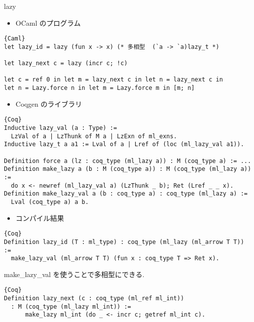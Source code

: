 \documentclass[unicode,mathserif]{beamer}
\begin{document}
\begin{frame}[fragile]
\begin{columns}[T]
    \begin{column}{0.33\columnwidth}
      \begin{block}{lazy}
        \begin{itemize}
          \item OCaml のプログラム
        \end{itemize}
        \begin{lstlisting}{Caml}
let lazy_id = lazy (fun x -> x) (* 多相型  (`a -> `a)lazy_t *)

let lazy_next c = lazy (incr c; !c)

let c = ref 0 in let m = lazy_next c in let n = lazy_next c in
let n = Lazy.force n in let m = Lazy.force m in [m; n]  \end{lstlisting}

\begin{itemize}
  \item Coqgen のライブラリ
\end{itemize}
\begin{lstlisting}{Coq}
Inductive lazy_val (a : Type) :=
  LzVal of a | LzThunk of M a | LzExn of ml_exns.
Inductive lazy_t a a1 := Lval of a | Lref of (loc (ml_lazy_val a1)).

Definition force a (lz : coq_type (ml_lazy a)) : M (coq_type a) := ...
Definition make_lazy a (b : M (coq_type a)) : M (coq_type (ml_lazy a)) :=
  do x <- newref (ml_lazy_val a) (LzThunk _ b); Ret (Lref _ _ x).
Definition make_lazy_val a (b : coq_type a) : coq_type (ml_lazy a) :=
  Lval (coq_type a) a b.
\end{lstlisting}
        \begin{itemize}
          \item コンパイル結果
        \end{itemize}
        \begin{lstlisting}{Coq}
Definition lazy_id (T : ml_type) : coq_type (ml_lazy (ml_arrow T T)) :=
  make_lazy_val (ml_arrow T T) (fun x : coq_type T => Ret x).  \end{lstlisting}
        make\_lazy\_val を使うことで多相型にできる. 
        \begin{lstlisting}{Coq}
Definition lazy_next (c : coq_type (ml_ref ml_int)) 
  : M (coq_type (ml_lazy ml_int)) :=
      make_lazy ml_int (do _ <- incr c; getref ml_int c).


\end{lstlisting}
\end{block}
\end{column}
\end{columns}
\end{frame}
\end{document}
